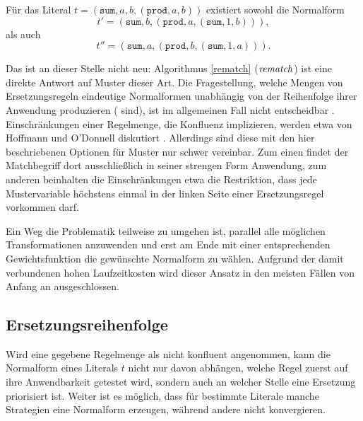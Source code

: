 Für das Literal $t = (\texttt{sum}, a, b, (\texttt{prod}, a, b))$ existiert sowohl die Normalform 
$$t' = (\texttt{sum}, b, (\texttt{prod}, a, (\texttt{sum}, 1, b))),$$ 
als auch 
$$t'' = (\texttt{sum}, a, (\texttt{prod}, b, (\texttt{sum}, 1, a))).$$

Das ist an dieser Stelle nicht neu: Algorithmus \ref{rematch} ($\mathit{rematch}$) ist eine direkte Antwort auf Muster dieser Art. Die Fragestellung, welche Mengen von Ersetzungsregeln eindeutige Normalformen unabhängig von der Reihenfolge ihrer Anwendung produzieren ( sind), ist im allgemeinen Fall nicht entscheidbar \cite{KonfluenzUnentscheidbar}.
Einschränkungen einer Regelmenge, die Konfluenz implizieren, werden etwa von Hoffmann und O'Donnell diskutiert \cite{hoffmann1982programming}. Allerdings sind diese mit den hier beschriebenen Optionen für Muster nur schwer vereinbar. Zum einen findet der Matchbegriff dort ausschließlich in seiner strengen Form Anwendung, zum anderen beinhalten die Einschränkungen etwa die Restriktion, dass jede Mustervariable höchstens einmal in der linken Seite einer Ersetzungsregel vorkommen darf.

Ein Weg die Problematik teilweise zu umgehen ist, parallel alle möglichen Transformationen anzuwenden und erst am Ende mit einer entsprechenden Gewichtsfunktion die gewünschte Normalform zu wählen. Aufgrund der damit verbundenen hohen Laufzeitkosten wird dieser Ansatz in den meisten Fällen von Anfang an ausgeschlossen.


\subsection{Ersetzungsreihenfolge}
Wird eine gegebene Regelmenge als nicht konfluent angenommen, kann die  Normalform eines Literals $t$ nicht nur davon abhängen, welche Regel zuerst auf ihre Anwendbarkeit getestet wird, sondern auch an welcher Stelle eine Ersetzung priorisiert ist. Weiter ist es möglich, dass für bestimmte Literale manche Strategien eine Normalform erzeugen, während andere nicht konvergieren.

